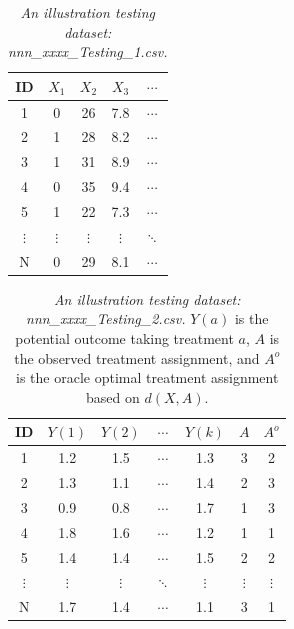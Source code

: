 \documentclass[12pt]{article}
\begin{document}
\begin{table}[htbp]
  \centering
  \caption{\emph{An illustration testing dataset: nnn\_xxxx\_Testing\_1.csv.} }
    \begin{tabular}{c|cccc}
    \hline
    \hline
    ID &  $X_1$    & $X_2$    & $X_3$    & $\cdots$ \\
    \hline
    1& 0     & 26    & 7.8   & $\cdots$ \\
    2& 1     & 28    & 8.2   & $\cdots$  \\
    3& 1     & 31    & 8.9   & $\cdots$  \\
    4& 0     & 35    & 9.4   & $\cdots$  \\
    5& 1     & 22    & 7.3   & $\cdots$  \\
    $\vdots$ &  $\vdots$   & $\vdots$     & $\vdots$     & $\ddots$  \\
    N &  0 & 29 & 8.1 & $\cdots$ \\
    \hline
    \hline
    \end{tabular}%
  \label{tab:TestingDataExample1}%
\end{table}


\begin{table}[htbp]
  \centering
  \caption{\emph{An illustration testing dataset: nnn\_xxxx\_Testing\_2.csv.} $Y(a)$ is the potential outcome taking treatment $a$, $A$ is the observed treatment assignment, and $A^o$ is the oracle optimal treatment assignment based on $d(X,A)$.}
    \begin{tabular}{c|cccc|cc}
    \hline
    \hline
    ID &  $Y(1)$    & $Y(2)$    & $\cdots$  & $Y(k)$ & $A$ & $A^o$   \\
    \hline
    1& 1.2    & 1.5    &  $\cdots$  & 1.3 & 3 & 2 \\
    2& 1.3    & 1.1    &  $\cdots$  & 1.4 & 2 & 3 \\
    3& 0.9    & 0.8    &  $\cdots$  & 1.7 & 1 & 3 \\
    4& 1.8    & 1.6    &  $\cdots$  & 1.2 & 1 & 1 \\
    5& 1.4    & 1.4    &  $\cdots$  & 1.5 & 2 & 2 \\
    $\vdots$ &  $\vdots$   & $\vdots$     & $\ddots$     & $\vdots$ &  $\vdots$   & $\vdots$ \\
    N & 1.7    & 1.4    &  $\cdots$  & 1.1 & 3 & 1 \\
    \hline
    \hline
    \end{tabular}%
  \label{tab:TestingDataExample2}%
\end{table}
\end{document}
